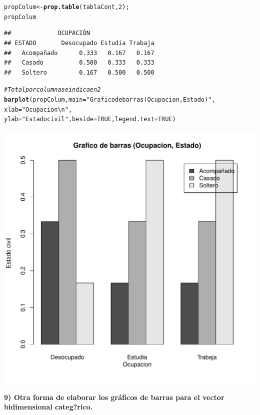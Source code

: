 \documentclass[12pt,letterpaper]{article}\usepackage[]{graphicx}\usepackage[]{color}
\makeatletter
\def\maxwidth{ %
  \ifdim\Gin@nat@width>\linewidth
    \linewidth
  \else
    \Gin@nat@width
  \fi
}
\newcommand{\hlnum}[1]{\textcolor[rgb]{0.686,0.059,0.569}{#1}}%
\newcommand{\hlstr}[1]{\textcolor[rgb]{0.192,0.494,0.8}{#1}}%
\newcommand{\hlcom}[1]{\textcolor[rgb]{0.678,0.584,0.686}{\textit{#1}}}%
\newcommand{\hlstd}[1]{\textcolor[rgb]{0.345,0.345,0.345}{#1}}%
\newcommand{\hlkwb}[1]{\textcolor[rgb]{0.69,0.353,0.396}{#1}}%
\newcommand{\hlkwc}[1]{\textcolor[rgb]{0.333,0.667,0.333}{#1}}%
\newcommand{\hlkwd}[1]{\textcolor[rgb]{0.737,0.353,0.396}{\textbf{#1}}}%
\newenvironment{kframe}{%
 \def\at@end@of@kframe{}%
 \ifinner\ifhmode%
  \def\at@end@of@kframe{\end{minipage}}%
  \begin{minipage}{\columnwidth}%
 \fi\fi%
 \def\FrameCommand##1{\hskip\@totalleftmargin \hskip-\fboxsep
 \colorbox{shadecolor}{##1}\hskip-\fboxsep
     \hskip-\linewidth \hskip-\@totalleftmargin \hskip\columnwidth}%
 \MakeFramed {\advance\hsize-\width
   \@totalleftmargin\z@ \linewidth\hsize
   \@setminipage}}%
 {\par\unskip\endMakeFramed%
 \at@end@of@kframe}
\newenvironment{knitrout}{}{} %
\makeatother
\begin{document}
\begin{knitrout}
\begin{kframe}
\begin{alltt}
\hlstd{propColum} \hlkwb{<-} \hlkwd{prop.table}\hlstd{(tablaCont,} \hlnum{2}\hlstd{);}
\hlstd{propColum}
\end{alltt}
\begin{verbatim}
##             OCUPACIÓN
## ESTADO       Desocupado Estudia Trabaja
##   Acompañado      0.333   0.167   0.167
##   Casado          0.500   0.333   0.333
##   Soltero         0.167   0.500   0.500
\end{verbatim}
\begin{alltt}
\hlcom{# Total por columna se indica en 2}
\hlkwd{barplot}\hlstd{(propColum,} \hlkwc{main}\hlstd{=}\hlstr{"Grafico de barras (Ocupacion, Estado)"}\hlstd{,}
        \hlkwc{xlab}\hlstd{=}\hlstr{"Ocupacion\textbackslash{}n"}\hlstd{,}
\hlkwc{ylab}\hlstd{=}\hlstr{"Estado civil"}\hlstd{,} \hlkwc{beside}\hlstd{=}\hlnum{TRUE}\hlstd{,} \hlkwc{legend.text}\hlstd{=}\hlnum{TRUE}\hlstd{)}
\end{alltt}
\end{kframe}
\includegraphics[width=\maxwidth]{figure/unnamed-chunk-7-3} 

\end{knitrout}
\textbf{9) Otra forma de elaborar los gr\'aficos de barras para el vector bidimensional categ?rico.} 
\end{document}

